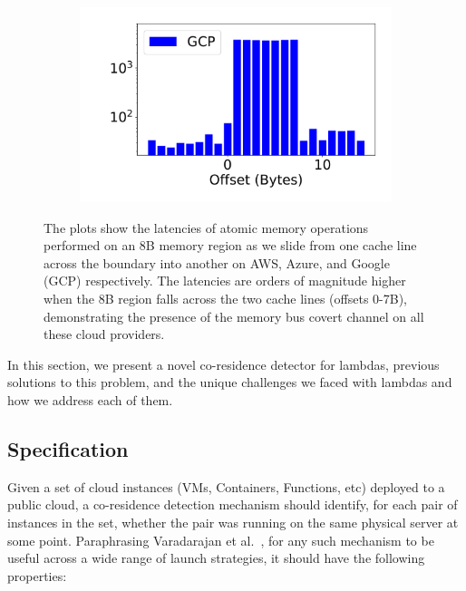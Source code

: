 \begin{figure}[h!]
\begin{subfigure}{.33\textwidth}
  \centering
  \includegraphics[width=.99\linewidth]{fig/membus_gcp.pdf}
\end{subfigure}
\caption{The plots show the latencies of atomic memory operations performed on
        an 8B memory region as we slide from one cache line across the boundary into
        another on AWS, Azure, and Google (GCP) respectively.  The latencies are orders
        of magnitude higher when the 8B region falls across the two cache lines (offsets
        0-7B), demonstrating the presence of the memory bus covert channel on all these
        cloud providers. \label{fig:membus_clouds}}
\label{fig:fig}
\end{figure}


In this section, we present a novel co-residence detector for lambdas, previous 
solutions to this problem, and the unique challenges we faced with lambdas and
how we address each of them.

\subsection{Specification}
Given a set of cloud instances (VMs, Containers, Functions, etc) deployed to a
public cloud, a co-residence detection mechanism should identify, for each pair
of instances in the set, whether the pair was running on the same physical
server at some point. Paraphrasing Varadarajan et al.~\cite{varadarajan2015},
for any such mechanism to be useful across a wide range of launch strategies, it
should have the following properties:

